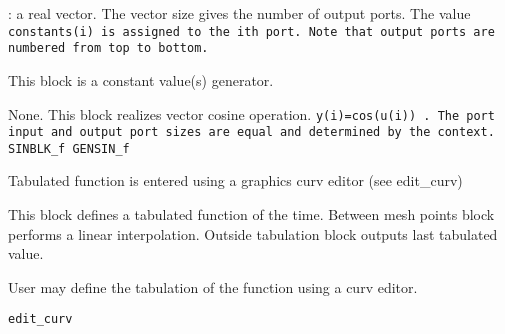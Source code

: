\label{CONSTf}

\begin{scitem}
\item[{\verb?constants?}]
: a real vector. The vector size gives the number of output
ports. The value %
\tt constants(i) %
\rm is assigned to the ith port.
Note that output ports are numbered from top to bottom.
\end{scitem}%
This block is a constant value(s) generator.




%
%


\label{COSBLKf}

None.
This block realizes vector cosine operation. %
\tt y(i)=cos(u(i))%
\rm .
The port input and output  port sizes are equal and determined by the
context.
{\verb?SINBLK_f GENSIN_f?} \pageref{SINBLKfGENSINf}








%
%


\label{CURVf}

Tabulated function is entered using a graphics curv editor (see edit\_curv)

This block defines a tabulated function of the time. Between mesh
points block performs a linear interpolation. Outside tabulation block
outputs last tabulated value.

User may define the tabulation of the function using a curv editor.

{\verb?edit_curv?} \pageref{editcurv}



%
%


\label{DELAYVf}


